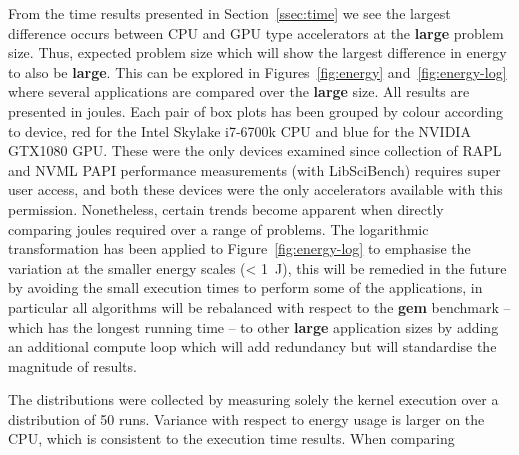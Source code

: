 \documentclass[../document.tex]{subfiles}
\begin{document}

From the time results presented in Section~\ref{ssec:time} we see the largest difference occurs between CPU and GPU type accelerators at the {\bf large} problem size.
Thus, expected problem size which will show the largest difference in energy to also be {\bf large}.
This can be explored in Figures~\ref{fig:energy} and~\ref{fig:energy-log} where several applications are compared over the {\bf large} size.
All results are presented in joules.
Each pair of box plots has been grouped by colour according to device, red for the Intel Skylake i7-6700k CPU and blue for the NVIDIA GTX1080 GPU.
These were the only devices examined since collection of RAPL and NVML PAPI performance measurements (with LibSciBench) requires super user access, and both these devices were the only accelerators available with this permission.
Nonetheless, certain trends become apparent when directly comparing joules required over a range of problems.
The logarithmic transformation has been applied to Figure~\ref{fig:energy-log} to emphasise the variation at the smaller energy scales (< \SI{1}{\joule}), this will be remedied in the future by avoiding the small execution times to perform some of the applications, in particular all algorithms will be rebalanced with respect to the {\bf gem} benchmark -- which has the longest running time -- to other {\bf large} application sizes by adding an additional compute loop which will add redundancy but will standardise the magnitude of results.

The distributions were collected by measuring solely the kernel execution over a distribution of 50 runs.
Variance with respect to energy usage is larger on the CPU, which is consistent to the execution time results.
When comparing 
\end{document}
